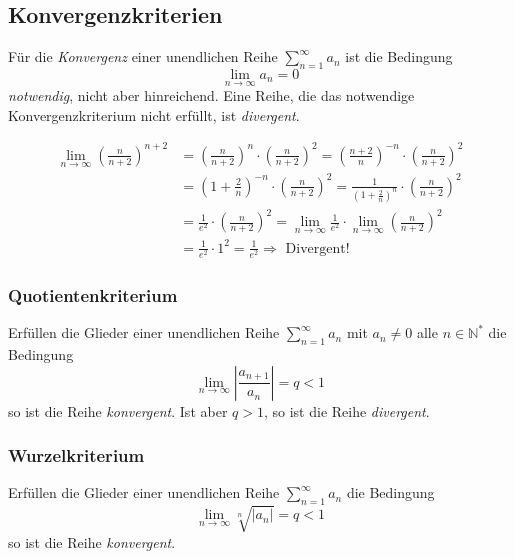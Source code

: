 \subsection{Konvergenzkriterien}
\begin{definition}Für die \textit{Konvergenz} einer unendlichen Reihe $\sum\limits_{n=1}^{\infty} a_n$ ist die Bedingung 
$$ \lim\limits_{n \rightarrow \infty} a_n = 0$$
\textit{notwendig}, nicht aber hinreichend. Eine Reihe, die das notwendige Konvergenzkriterium nicht erfüllt, ist \textit{divergent}.
\end{definition}
\begin{bsp}
\begin{align*}
	\lim\limits_{n \rightarrow \infty} \left(\frac{n}{n+2}\right)^{n+2} 	
		&= \left(\frac{n}{n+2}\right)^{n} \cdot \left(\frac{n}{n+2}\right)^{2}  
		= \left(\frac{n+2}{n}\right)^{-n} \cdot \left(\frac{n}{n+2}\right)^{2}\\
		&= \left(1 + \frac{2}{n}\right)^{-n} \cdot \left(\frac{n}{n+2}\right)^{2} 
		= \frac{1}{\left(1+\frac{2}{n}\right)^{n}} \cdot \left(\frac{n}{n+2}\right)^{2}\\
		&=\frac{1}{e^{2}} \cdot \left(\frac{n}{n+2}\right)^{2} 
		= \lim\limits_{n \rightarrow \infty} \frac{1}{e^2} \cdot \lim\limits_{n \rightarrow \infty} \left(\frac{n}{n+2}\right)^2 \\
		&= \frac{1}{e^2} \cdot 1^2 
		= \frac{1}{e^2} \Rightarrow \text{ Divergent! }
\end{align*}
\end{bsp}

\subsubsection*{Quotientenkriterium}
\begin{definition}
Erfüllen die Glieder einer unendlichen Reihe $\sum\limits_{n=1}^{\infty} a_n $ mit $ a_n \neq 0 $ alle $ n \in \mathbb{N}^*$ die Bedingung 
\[
\lim_{n \rightarrow \infty} \left| \frac{a_{n+1}}{a_n} \right|= q < 1
\]
so ist die Reihe \textit{konvergent}. Ist aber $q>1$, so ist die Reihe \textit{divergent}. 
\end{definition}

\subsubsection*{Wurzelkriterium}
\begin{definition}
Erfüllen die Glieder einer unendlichen Reihe $\sum\limits_{n=1}^{\infty} a_n $ die Bedingung 
\[
 \lim_{n \rightarrow \infty} \sqrt[n]{|a_n|} = q < 1
\]
so ist die Reihe \textit{konvergent}. 
\end{definition}

